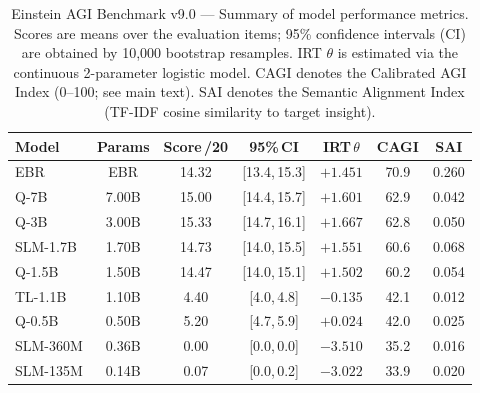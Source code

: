 \begin{table}[htbp]
\centering
\caption{\label{tab:results}Einstein AGI Benchmark v9.0 --- Summary of model performance metrics. Scores are means over the evaluation items; 95\% confidence intervals (CI) are obtained by 10{,}000 bootstrap resamples. IRT $\theta$ is estimated via the continuous 2-parameter logistic model. CAGI denotes the Calibrated AGI Index (0--100; see main text). SAI denotes the Semantic Alignment Index (TF-IDF cosine similarity to target insight).}
\begin{ruledtabular}
\begin{tabular}{lcccccc}
Model & Params & Score\,/20 & 95\%\,CI & IRT\,$\theta$ & CAGI & SAI \\
\hline
EBR & EBR & 14.32 & [13.4,\,15.3] & $+1.451$ & 70.9 & 0.260 \\
Q-7B & 7.00B & 15.00 & [14.4,\,15.7] & $+1.601$ & 62.9 & 0.042 \\
Q-3B & 3.00B & 15.33 & [14.7,\,16.1] & $+1.667$ & 62.8 & 0.050 \\
SLM-1.7B & 1.70B & 14.73 & [14.0,\,15.5] & $+1.551$ & 60.6 & 0.068 \\
Q-1.5B & 1.50B & 14.47 & [14.0,\,15.1] & $+1.502$ & 60.2 & 0.054 \\
TL-1.1B & 1.10B & 4.40 & [4.0,\,4.8] & $-0.135$ & 42.1 & 0.012 \\
Q-0.5B & 0.50B & 5.20 & [4.7,\,5.9] & $+0.024$ & 42.0 & 0.025 \\
SLM-360M & 0.36B & 0.00 & [0.0,\,0.0] & $-3.510$ & 35.2 & 0.016 \\
SLM-135M & 0.14B & 0.07 & [0.0,\,0.2] & $-3.022$ & 33.9 & 0.020 \\
\end{tabular}
\end{ruledtabular}
\end{table}